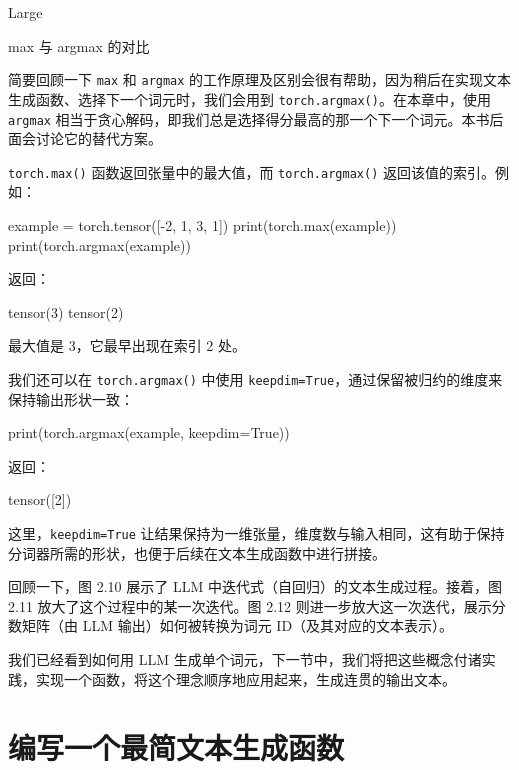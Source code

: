 \begin{codebox}
 Large
\end{codebox}

\begin{mySidebar}{max 与 argmax 的对比}

简要回顾一下 \texttt{max} 和 \texttt{argmax} 的工作原理及区别会很有帮助，因为稍后在实现文本生成函数、选择下一个词元时，我们会用到 \texttt{torch.argmax()}。在本章中，使用 \texttt{argmax} 相当于贪心解码，即我们总是选择得分最高的那一个下一个词元。本书后面会讨论它的替代方案。

\texttt{torch.max()} 函数返回张量中的最大值，而 \texttt{torch.argmax()} 返回该值的索引。例如：

\begin{codebox}
example = torch.tensor([-2, 1, 3, 1])
print(torch.max(example))
print(torch.argmax(example))
\end{codebox}

返回：

\begin{codebox}
tensor(3)
tensor(2)
\end{codebox}

最大值是 3，它最早出现在索引 2 处。

我们还可以在 \texttt{torch.argmax()} 中使用 \texttt{keepdim=True}，通过保留被归约的维度来保持输出形状一致：

\begin{codebox}
print(torch.argmax(example, keepdim=True))
\end{codebox}

返回：

\begin{codebox}
tensor([2])
\end{codebox}

这里，\texttt{keepdim=True} 让结果保持为一维张量，维度数与输入相同，这有助于保持分词器所需的形状，也便于后续在文本生成函数中进行拼接。

\end{mySidebar}

回顾一下，图 2.10 展示了 LLM 中迭代式（自回归）的文本生成过程。接着，图 2.11 放大了这个过程中的某一次迭代。图 2.12 则进一步放大这一次迭代，展示分数矩阵（由 LLM 输出）如何被转换为词元 ID（及其对应的文本表示）。

我们已经看到如何用 LLM 生成单个词元，下一节中，我们将把这些概念付诸实践，实现一个函数，将这个理念顺序地应用起来，生成连贯的输出文本。

\section{编写一个最简文本生成函数}

